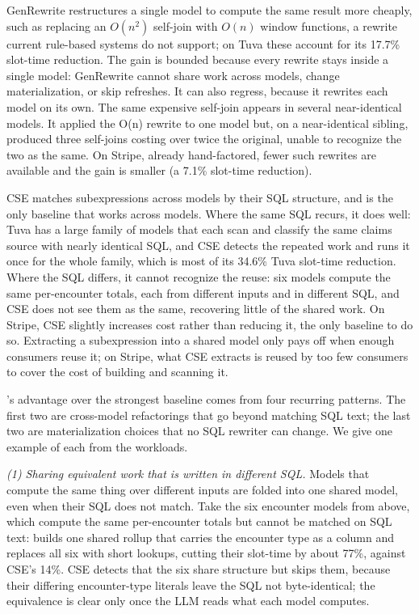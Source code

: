  GenRewrite restructures a single model to compute the same result more cheaply, such as replacing an $O(n^2)$ self-join with $O(n)$ window functions, a rewrite current rule-based systems do not support; on Tuva these account for its 17.7\% slot-time reduction. The gain is bounded because every rewrite stays inside a single model: GenRewrite cannot share work across models, change materialization, or skip refreshes. It can also regress, because it rewrites each model on its own. The same expensive self-join appears in several near-identical models. It applied the O(n) rewrite to one model but, on a near-identical sibling, produced three self-joins costing over twice the original, unable to recognize the two as the same. On Stripe, already hand-factored, fewer such rewrites are available and the gain is smaller (a 7.1\% slot-time reduction). 

 CSE matches subexpressions across models by their SQL structure, and is the only baseline that works across models. Where the same SQL recurs, it does well: Tuva has a large family of models that each scan and classify the same claims source with nearly identical SQL, and CSE detects the repeated work and runs it once for the whole family, which is most of its 34.6\% Tuva slot-time reduction. Where the SQL differs, it cannot recognize the reuse: six models compute the same per-encounter totals, each from different inputs and in different SQL, and CSE does not see them as the same, recovering little of the shared work. On Stripe, CSE slightly increases cost rather than reducing it, the only baseline to do so. Extracting a subexpression into a shared model only pays off when enough consumers reuse it; on Stripe, what CSE extracts is reused by too few consumers to cover the cost of building and scanning it. 



 \tool{}'s advantage over the strongest baseline comes from four recurring patterns. The first two are cross-model refactorings that go beyond matching SQL text; the last two are materialization choices that no SQL rewriter can change. We give one example of each from the workloads.

\emph{(1) Sharing equivalent work that is written in different SQL.} Models that compute the same thing over different inputs are folded into one shared model, even when their SQL does not match. Take the six encounter models from above, which compute the same per-encounter totals but cannot be matched on SQL text: \tool{} builds one shared rollup that carries the encounter type as a column and replaces all six with short lookups, cutting their slot-time by about 77\%, against CSE's 14\%.  CSE detects that the six share structure but skips them, because their differing encounter-type literals leave the SQL not byte-identical; the equivalence is clear only once the LLM reads what each model computes.

